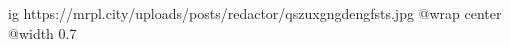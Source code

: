  
 
 
 
 

\ifcmt
  ig https://mrpl.city/uploads/posts/redactor/qszuxgngdengfsts.jpg
  @wrap center
  @width 0.7
\fi
